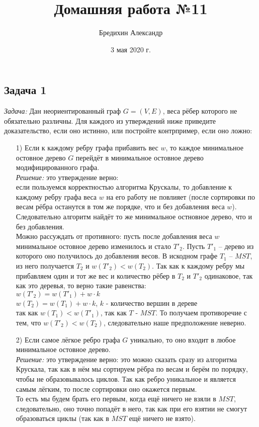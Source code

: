 \documentclass[a4paper,12pt]{article} %
\author{Бредихин Александр}
\title{Домашняя работа №11}
\date {3 мая 2020 г.}
\begin{document}
\maketitle


\subsection*{Задача 1}
\textit{Задача:} Дан неориентированный граф $G = (V,E)$, веса рёбер которого не обязательно различны. Для каждого из утверждений ниже приведите доказательство, если оно истинно, или постройте контрпример, если оно ложно:\\
\begin{itemize}
\item[1) ] Если к каждому ребру графа прибавить вес $w$, то каждое минимальное остовное дерево $G$ перейдёт в минимальное остовное дерево модифицированного графа.\\

\textit{Решение:} это утверждение верно:\\
если пользуемся корректностью алгоритма Крускалы, то добавление к каждому ребру графа веса $w$ на его работу не повлияет (после сортировки по весам рёбра останутся в том же порядке, что и без добавления веса $w$). Следовательно алгоритм найдёт то же минимальное остновное дерево, что и без добавления.\\

Можно рассуждать от противного: пусть после добавления веса $w$ минимальное остовное дерево изменилось и стало $ T'_2 $. Пусть $ T'_1 $ -- дерево из которого оно получилось до добавления весов. В искодном графе $ T_1 $ -- $ MST $, из него получается $ T_2 $ и $ w(T'_2) < w(T_2) $. Так как к каждому ребру мы прибавляем один и тот же вес и количество рёбер в $ T_2 $ и $ T'_2 $ одинаковое, так как это деревья, то верно такие равенства:\\
$ w(T'_2) = w(T'_1) + w \cdot k $\\
$ w(T_2) = w(T_1) + w \cdot k $, $ k $ - количество вершин в дереве\\
так как $ w(T_1) < w(T'_1) $, так как $ T $ - $ MST $. То получаем противоречие с тем, что $ w(T'_2) < w(T_2) $, следовательно наше предположение неверно.

\item[2) ] Если самое лёгкое ребро графа $G$ уникально, то оно входит в любое минимальное остовное дерево.\\

\textit{Решение:} это утверждение верно: это можно сказать сразу из алгоритма Крускала, так как в нём мы сортируем рёбра по весам и берём по порядку, чтобы не образовывалось циклов. Так как ребро уникальное и является самым лёгким, то после сортировки оно окажется первым. \\
То есть мы будем брать его первым, когда ещё ничего не взяли в $ MST $, следовательно, оно точно попадёт в него, так как при его взятии не смогут образоваться циклы (так как в $ MST $ ещё ничего не взято).\\


\end{itemize}
\end{document}
